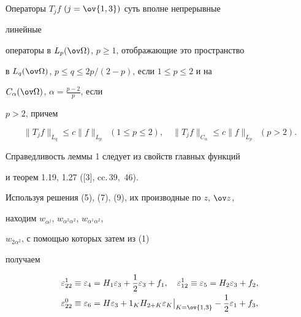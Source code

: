\begin{lem} Операторы $T_jf$ $(j=\ov{1,3})$ суть вполне непрерывные 


линейные  


операторы в $L_p(\ov\Omega)$, $p\ge 1$, отображающие это пространство 


в $L_q(\ov\Omega)$, $p\le q\le 2p/(2-p)$, если $1\le p \le 2$ и на 


$C_\alpha(\ov\Omega)$, $\alpha=\frac{p-2}{p}$, если 


$p>2$, причем 


$$ 


\|T_jf\|_{L_q}\le c\|f\|_{L_p} \ \;(1\le p\le 2),\quad 


\|T_jf\|_{C_\alpha}\le c\|f\|_{L_p} \ \;(p>2). 


$$ 


\end{lem} 


 


Справедливость леммы 1 следует из свойств главных функций 


и теорем 1.19, 1.27 ([3], cc.\,39,~46). 


 


Используя решения (5), (7), (9), их производные по $z$, $\ov z$,


находим $w_{\alpha^j}$, $w_{\alpha^2\alpha^2}$, $w_{\alpha^1\alpha^2}$, 


$w_{2\alpha^2}$, с помощью которых затем из (1) 


получаем 


\begin{equation} 


\begin{split} 


\varepsilon^1_{22}&\equiv\varepsilon_4=H_1\varepsilon_3+ 


\frac{1}{2}\varepsilon_3+f_1,\quad 


\varepsilon^1_{12}\equiv\varepsilon_5=H_2\varepsilon_3+f_2, \\ 


\varepsilon^0_{22}&\equiv\varepsilon_6=H\varepsilon_3+ 


1_K H_{2+K}\varepsilon_K\big|_{K=\ov{1,3}}- 


\frac{1}{2}\varepsilon_1+f_3, 


\end{split} 


\end{equation} 


